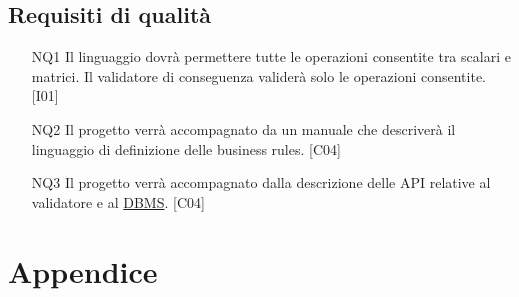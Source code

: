 \section{Requisiti di qualit\`a}
\begin{itemize}
\item[NQ1]{Il linguaggio dovr\`a permettere tutte le operazioni consentite tra scalari e matrici. Il validatore di conseguenza valider\`a solo le operazioni consentite. [I01]}
\item[NQ2]{Il progetto verr\`a accompagnato da un manuale che descriver\`a il linguaggio di definizione delle business rules. [C04]}
\item[NQ3]{Il progetto verr\`a accompagnato dalla descrizione delle API relative al validatore e al \underline{DBMS}. [C04]}
\end{itemize}
\newpage


\chapter{Appendice}
